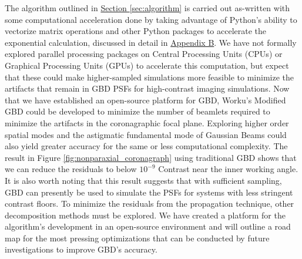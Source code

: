 The algorithm outlined in \hyperref[sec:algorithm]{Section \ref{sec:algorithm}} is carried out as-written with some computational acceleration done by taking advantage of Python's ability to vectorize matrix operations and other Python packages to accelerate the exponential calculation, discussed in detail in \hyperref[sec:appendixB]{Appendix B}. We have not formally explored parallel processing packages on Central Processing Units (CPUs) or Graphical Processing Units (GPUs) to accelerate this computation, but expect that these could make higher-sampled simulations more feasible to minimize the artifacts that remain in GBD PSFs for high-contrast imaging simulations.
Now that we have established an open-source platform for GBD, Worku's Modified GBD\cite{Worku19} could be developed to minimize the number of beamlets required to minimize the artifacts in the coronagraphic focal plane. Exploring higher order spatial modes and the astigmatic fundamental mode of Gaussian Beams could also yield greater accuracy for the same or less computational complexity. 
The result in Figure \ref{fig:nonparaxial_coronagraph} using traditional GBD shows that we can reduce the residuals to below $10^{-9}$ Contrast near the inner working angle. It is also worth noting that this result suggests that with sufficient sampling, GBD can presently be used to simulate the PSFs for systems with less stringent contrast floors. To minimize the residuals from the propagation technique, other decomposition methods must be explored. We have created a platform for the algorithm's development in an open-source environment and will outline a road map for the most pressing optimizations that can be conducted by future investigations to improve GBD's accuracy.

